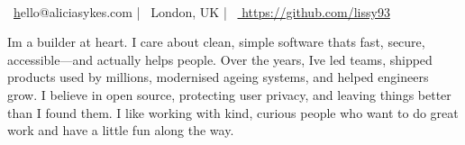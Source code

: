 \documentclass[]{resume-format}
\begin{document}
%


\setlength\fboxsep{10pt}%

\begingroup

\noindent
\colorbox{headerbg}{
  \parbox{\dimexpr\textwidth-2\fboxsep}{
    \color{white} %
    \begin{center} %
      \\[2mm] %
      \faEnvelope~\href{mailto:hello@aliciasykes.com}hello@aliciasykes.com %
      \quad|\quad %
      \faMapMarker~London, UK %
      \quad|\quad %
      \faLink~\href{ https://github.com/lissy93 }{ https://github.com/lissy93 } %
    \end{center} %
  }
}
\endgroup
\vspace{2mm} %



\begin{cvpersonalstatement}
  \item { I\textquotesingle{}m a builder at heart. I care about clean, simple software that\textquotesingle{}s fast,
secure, accessible—and actually helps people.
Over the years, I\textquotesingle{}ve led teams, shipped products used by millions,
modernised ageing systems, and helped engineers grow.
I believe in open source, protecting user privacy, and leaving things better
than I found them.
I like working with kind, curious people who want to do great work and have a
little fun along the way.
 }
\end{cvpersonalstatement}


\end{document}
